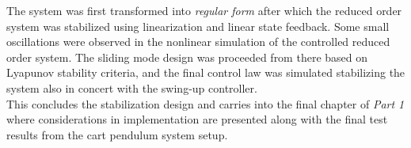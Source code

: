 %
The system was first transformed into \textit{regular form} after which the reduced order system was stabilized using linearization and linear state feedback. Some small oscillations were observed in the nonlinear simulation of the controlled reduced order system. The sliding mode design was proceeded from there based on Lyapunov stability criteria, and the final control law was simulated stabilizing the system also in concert with the swing-up controller.\\
This concludes the stabilization design and carries into the final chapter of \textit{Part 1} where considerations in implementation are presented along with the final test results from the cart pendulum system setup.
